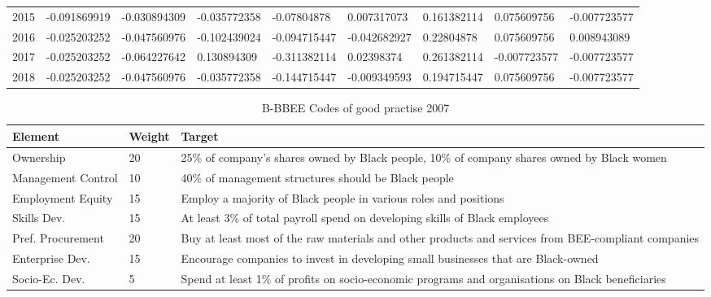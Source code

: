 \begin{table}[H]
\begin{tabular}{m{4cm} m{1.5cm} m{5.5cm}}
2015 & -0.091869919    & -0.030894309   & -0.035772358      & -0.07804878  & 0.007317073  & 0.161382114 & 0.075609756  & -0.007723577       \\
2016 & -0.025203252    & -0.047560976   & -0.102439024      & -0.094715447 & -0.042682927 & 0.22804878  & 0.075609756  & 0.008943089        \\
2017 & -0.025203252    & -0.064227642   & 0.130894309       & -0.311382114 & 0.02398374   & 0.261382114 & -0.007723577 & -0.007723577       \\
2018 & -0.025203252    & -0.047560976   & -0.035772358      & -0.144715447 & -0.009349593 & 0.194715447 & 0.075609756  & -0.007723577  
\bottomrule
\end{tabular}
\end{table}%

\begin{table}[H] %
\centering
\caption{B-BBEE Codes of good practise 2007}
\begin{tabular}{m{4cm} m{1.5cm} m{5.5cm}} %
\bottomrule
Element & Weight & Target\\
\midrule
Ownership & 20 & 25\% of company's shares owned by Black people, 10\% of company shares owned by Black women
 \\
Management Control & 10 & 40\% of management structures should be Black people \\
Employment Equity  & 15 & Employ a majority of Black people in various roles and positions \\
Skills Dev. & 15 & At least 3\% of total payroll spend on developing skills of Black employees \\
Pref. Procurement & 20  & Buy at least most of the raw materials and other products and services from BEE-compliant companies\\ 
Enterprise Dev.  & 15 & Encourage companies to invest in developing small businesses that are Black-owned \\
Socio-Ec. Dev. & 5 & Spend at least 1\% of profits on socio-economic programs and organisations on Black beneficiaries \\
\bottomrule
\end{tabular}
\end{table}%

